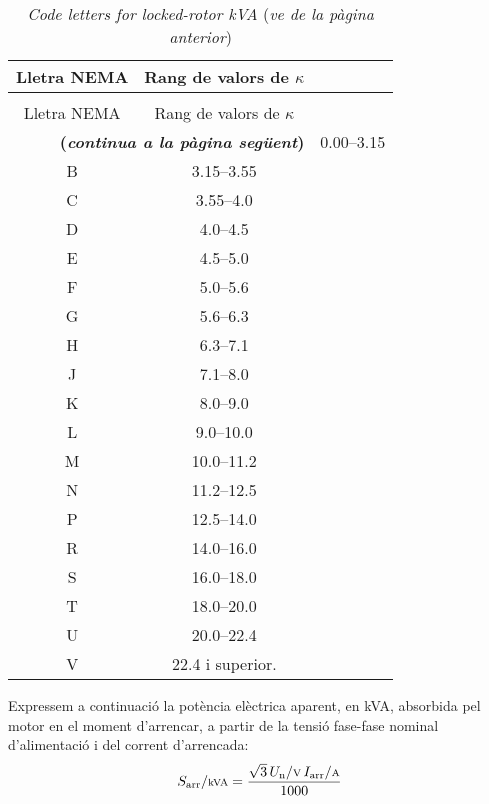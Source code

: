 \begin{longtable}[h]{cc}
	\caption{\label{taula:LR-code} \textit{Code letters for locked-rotor kVA}}\\
	\toprule[1pt]
	Lletra NEMA & Rang de valors de $\kappa$\\
	\midrule
	\endfirsthead
	\caption[]{\textit{Code letters for locked-rotor kVA} (\emph{ve de la pàgina anterior})}\\
	\toprule[1pt]
	Lletra NEMA & Rang de valors de $\kappa$\\
	\midrule
	\endhead
	\midrule
	\multicolumn{2}{r}{\sffamily\bfseries\color{NavyBlue}(\emph{continua a la pàgina següent})}
	\endfoot
	\endlastfoot
	A & \numrange{0,00}{3,15} \\
	B & \numrange{3,15}{3,55} \\
	C & \numrange{3,55}{4,0} \\
	D & \numrange{4,0}{4,5} \\
	E & \numrange{4,5}{5,0} \\
	F & \numrange{5,0}{5,6} \\
	G & \numrange{5,6}{6,3} \\
	H & \numrange{6,3}{7,1} \\
	J & \numrange{7,1}{8,0}\\
	K & \numrange{8,0}{9,0} \\
	L & \numrange{9,0}{10,0} \\
	M & \numrange{10,0}{11,2} \\
	N & \numrange{11,2}{12,5} \\
	P & \numrange{12,5}{14,0} \\
	R & \numrange{14,0}{16,0} \\
	S & \numrange{16,0}{18,0} \\
	T & \numrange{18,0}{20,0} \\
	U & \numrange{20,0}{22,4} \\
	V & \num{22,4} i superior. \\
	\bottomrule[1pt]
\end{longtable}
              

Expressem a continuació la potència elèctrica aparent, en kVA, absorbida pel motor en el moment d'arrencar, a partir de la tensió fase-fase nominal d'alimentació i del corrent d'arrencada:
\begin{equation}
    S\ped{arr}/{\scriptstyle \unit{kVA}} = \frac{\sqrt{3}\,U\ped{n}/{\scriptstyle \unit{V}}\,I\ped{arr}/{\scriptstyle \unit{A}}}{1000}
\end{equation}

